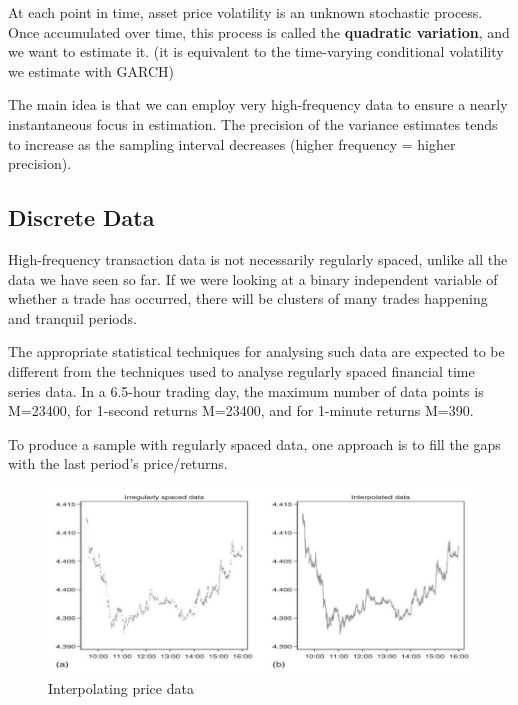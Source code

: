 \documentclass[11pt]{article}
\begin{document}
\begin{shaded}
    At each point in time, asset price volatility is an unknown stochastic process. Once accumulated over time, this process is called the \textbf{quadratic variation}, and we want to estimate it. (it is equivalent to the time-varying conditional volatility we estimate with GARCH)

    The main idea is that we can employ very high-frequency data to ensure a nearly instantaneous focus in estimation. The precision of the variance estimates tends to increase as the sampling interval decreases (higher frequency = higher precision).
\end{shaded}

\subsection{Discrete Data}

High-frequency transaction data is not necessarily regularly spaced, unlike all the data we have seen so far. If we were looking at a binary independent variable of whether a trade has occurred, there will be clusters of many trades happening and tranquil periods.

The appropriate statistical techniques for analysing such data are expected to be different from the techniques used to analyse regularly spaced financial time series data. In a 6.5-hour trading day, the maximum number of data points is M=23400, for 1-second returns M=23400, and for 1-minute returns M=390.

To produce a sample with regularly spaced data, one approach is to fill the gaps with the last period's price/returns.

\begin{figure}[h]
    \centering
    \includegraphics[width=12cm]{pics/irregular price data.png}
    \caption{Interpolating price data}
    \label{fig: fixing irregular data graph}
\end{figure}
\end{document}
